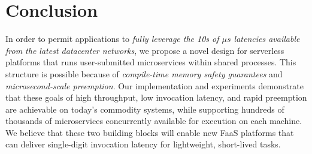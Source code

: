 \section{Conclusion}
\label{sec:concl}

In order to permit applications to \textit{fully leverage the 10s of $\mu{}s$
latencies available from the latest datacenter networks}, we propose a novel design
for serverless platforms that runs user-submitted microservices within shared
processes.  This structure is possible because of
\textit{compile-time memory safety guarantees} and \textit{microsecond-scale
preemption}.  Our implementation and experiments demonstrate that these goals of
high throughput, low invocation latency, and rapid preemption are achievable
on today's commodity systems, while supporting hundreds of thousands of
microservices concurrently available for execution on each machine.  We believe that these
two building blocks will enable new FaaS platforms that can deliver single-digit
invocation latency for lightweight, short-lived tasks.
